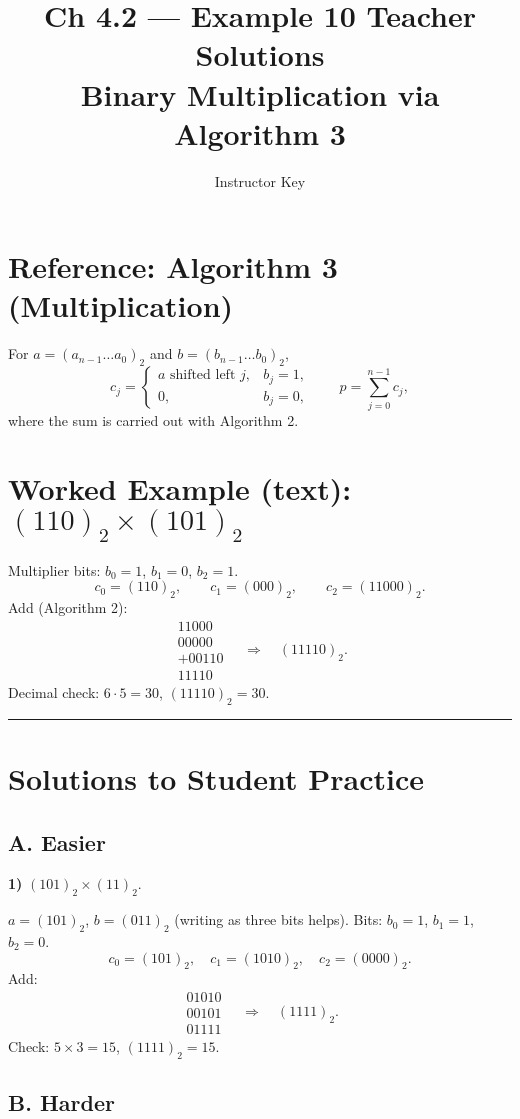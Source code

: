 \documentclass[12pt]{article}
\title{Ch 4.2 — Example 10 Teacher Solutions\\Binary Multiplication via Algorithm 3}
\author{Instructor Key}
\date{}
\begin{document}
\maketitle

\section*{Reference: Algorithm 3 (Multiplication)}
For $a=(a_{n-1}\dots a_0)_2$ and $b=(b_{n-1}\dots b_0)_2$,
\[
c_j=\begin{cases}
a \text{ shifted left $j$}, & b_j=1,\\
0, & b_j=0,
\end{cases}
\qquad
p=\sum_{j=0}^{n-1} c_j,
\]
where the sum is carried out with Algorithm 2.

\section*{Worked Example (text): $(110)_2 \times (101)_2$}
Multiplier bits: $b_0=1$, $b_1=0$, $b_2=1$.
\[
c_0=(110)_2,\qquad c_1=(000)_2,\qquad c_2=(11000)_2.
\]
Add (Algorithm 2):
\[
\begin{array}{r}
11000\\
00000\\
+00110\\ \hline
11110
\end{array}
\quad\Rightarrow\quad (11110)_2.
\]
Decimal check: $6\cdot 5=30$, $(11110)_2=30$.

\bigskip
\hrule
\bigskip

\section*{Solutions to Student Practice}

\subsection*{A. Easier}
\textbf{1) } $(101)_2 \times (11)_2$.

$a=(101)_2$, $b=(011)_2$ (writing as three bits helps). Bits: $b_0=1$, $b_1=1$, $b_2=0$.
\[
c_0=(101)_2,\quad c_1=(1010)_2,\quad c_2=(0000)_2.
\]
Add:
\[
\begin{array}{r}
01010\\
00101\\ \hline
01111
\end{array}
\quad\Rightarrow\quad (1111)_2.
\]
Check: $5\times 3=15$, $(1111)_2=15$.

\subsection*{B. Harder}
\end{document}
